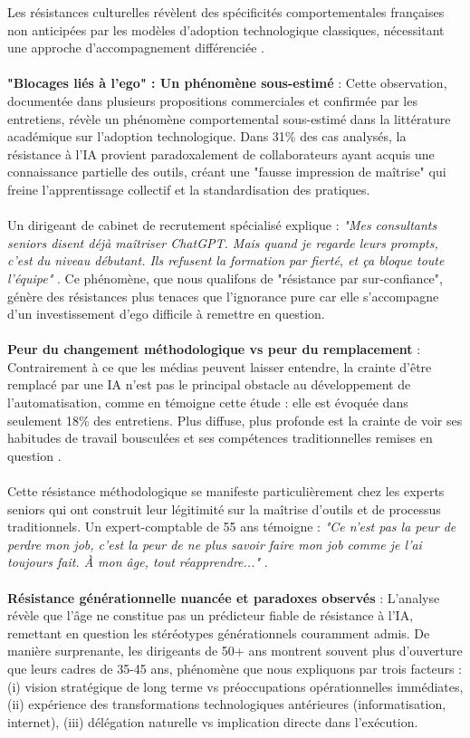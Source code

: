 Les résistances culturelles révèlent des spécificités comportementales françaises non anticipées par les modèles d'adoption technologique classiques, nécessitant une approche d'accompagnement différenciée \cite{venkatesh2003user}.
\\\\
\textbf{"Blocages liés à l'ego" : Un phénomène sous-estimé} : Cette observation, documentée dans plusieurs propositions commerciales et confirmée par les entretiens, révèle un phénomène comportemental sous-estimé dans la littérature académique sur l'adoption technologique. Dans 31\% des cas analysés, la résistance à l'IA provient paradoxalement de collaborateurs ayant acquis une connaissance partielle des outils, créant une "fausse impression de maîtrise" qui freine l'apprentissage collectif et la standardisation des pratiques.
\\\\
Un dirigeant de cabinet de recrutement spécialisé explique : \emph{"Mes consultants seniors disent déjà maîtriser ChatGPT. Mais quand je regarde leurs prompts, c'est du niveau débutant. Ils refusent la formation par fierté, et ça bloque toute l'équipe"} \cite{luwai2025antilogy}. Ce phénomène, que nous qualifons de "résistance par sur-confiance", génère des résistances plus tenaces que l'ignorance pure car elle s'accompagne d'un investissement d'ego difficile à remettre en question.
\\\\
\textbf{Peur du changement méthodologique vs peur du remplacement} : Contrairement à ce que les médias peuvent laisser entendre, la crainte d'être remplacé par une IA n'est pas le principal obstacle au développement de l'automatisation, comme en témoigne cette étude : elle est évoquée dans seulement 18\% des entretiens. Plus diffuse, plus profonde est la crainte de voir ses habitudes de travail bousculées et ses compétences traditionnelles remises en question \cite{schein2017organizational}.
\\\\
Cette résistance méthodologique se manifeste particulièrement chez les experts seniors qui ont construit leur légitimité sur la maîtrise d'outils et de processus traditionnels. Un expert-comptable de 55 ans témoigne : \emph{"Ce n'est pas la peur de perdre mon job, c'est la peur de ne plus savoir faire mon job comme je l'ai toujours fait. À mon âge, tout réapprendre..."} \cite{luwai2025meetings}.
\\\\
\textbf{Résistance générationnelle nuancée et paradoxes observés} : L'analyse révèle que l'âge ne constitue pas un prédicteur fiable de résistance à l'IA, remettant en question les stéréotypes générationnels couramment admis. De manière surprenante, les dirigeants de 50+ ans montrent souvent plus d'ouverture que leurs cadres de 35-45 ans, phénomène que nous expliquons par trois facteurs : (i) vision stratégique de long terme vs préoccupations opérationnelles immédiates, (ii) expérience des transformations technologiques antérieures (informatisation, internet), (iii) délégation naturelle vs implication directe dans l'exécution.
